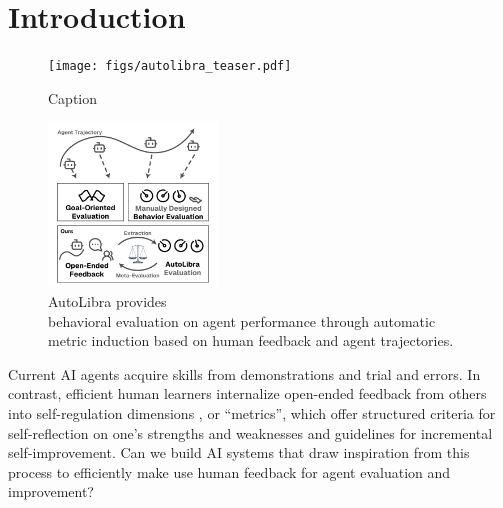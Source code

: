 \section{Introduction}
\begin{figure}
    \centering
    \texttt{[image: figs/autolibra\_teaser.pdf]}
    \caption{Caption}
    \label{fig:enter-label}
\end{figure}
\begin{figure} 
\vspace{-64pt}
   \centering
   \includegraphics[width=0.4\textwidth]{figs/autolibra.pdf}
   \vspace{-10pt}
   \caption{AutoLibra provides \\ 
    behavioral evaluation on agent performance
    through automatic metric induction based on human feedback and agent trajectories.}
\end{figure}

Current AI agents acquire skills from demonstrations and trial and errors.
In contrast, efficient human learners internalize open-ended feedback from others into self-regulation dimensions
\citep{pintrich2002development,nicol2006formative},  or ``metrics'', which offer structured criteria for self-reflection on one's 
strengths and weaknesses and guidelines for incremental self-improvement.
Can we build AI systems that draw inspiration from this process to efficiently make use human feedback for agent evaluation and improvement?

